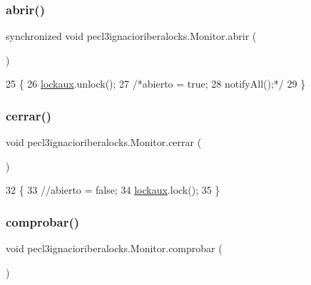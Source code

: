 \subsubsection{\texorpdfstring{abrir()}{abrir()}}
{\footnotesize\ttfamily synchronized void pecl3ignacioriberalocks.\+Monitor.\+abrir (\begin{DoxyParamCaption}{ }\end{DoxyParamCaption})\hspace{0.3cm}{\ttfamily [inline]}}


\begin{DoxyCode}
25     \{
26         \mbox{\hyperlink{classpecl3ignacioriberalocks_1_1_monitor_acde04bf90a7d9fc0ab9e3362f8c594bf}{lockaux}}.unlock();
27         \textcolor{comment}{/*abierto = true;}
28 \textcolor{comment}{        notifyAll();*/}
29     \}
\end{DoxyCode}
\mbox{\label{classpecl3ignacioriberalocks_1_1_monitor_aa780ba5836e28e77615854afb0ad251d}} 
\subsubsection{\texorpdfstring{cerrar()}{cerrar()}}
{\footnotesize\ttfamily void pecl3ignacioriberalocks.\+Monitor.\+cerrar (\begin{DoxyParamCaption}{ }\end{DoxyParamCaption})\hspace{0.3cm}{\ttfamily [inline]}}


\begin{DoxyCode}
32     \{
33         \textcolor{comment}{//abierto = false;}
34         \mbox{\hyperlink{classpecl3ignacioriberalocks_1_1_monitor_acde04bf90a7d9fc0ab9e3362f8c594bf}{lockaux}}.lock();
35     \}
\end{DoxyCode}
\mbox{\label{classpecl3ignacioriberalocks_1_1_monitor_a499e23011f3562a32a0587d74d6a0154}} 
\subsubsection{\texorpdfstring{comprobar()}{comprobar()}}
{\footnotesize\ttfamily void pecl3ignacioriberalocks.\+Monitor.\+comprobar (\begin{DoxyParamCaption}{ }\end{DoxyParamCaption})\hspace{0.3cm}{\ttfamily [inline]}}


